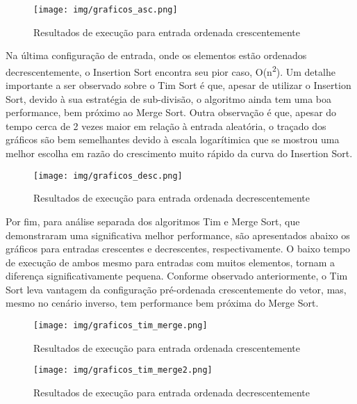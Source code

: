 \begin{figure}[!htb]
\centering
\texttt{[image: img/graficos\_asc.png]}
\caption{Resultados de execução para entrada ordenada crescentemente}
\label{fig:grafico_asc}
\end{figure}

Na última configuração de entrada, onde os elementos estão ordenados decrescentemente, o Insertion Sort encontra seu pior caso, O(n\textsuperscript{2}). Um detalhe importante a ser observado sobre o Tim Sort é que, apesar de utilizar o Insertion Sort, devido à sua estratégia de sub-divisão, o algoritmo ainda tem uma boa performance, bem próximo ao Merge Sort. Outra observação é que, apesar do tempo cerca de 2 vezes maior em relação à entrada aleatória, o traçado dos gráficos são bem semelhantes devido à escala logarítimica que se mostrou uma melhor escolha em razão do crescimento muito rápido da curva do Insertion Sort.

\begin{figure}[!htb]
\centering
\texttt{[image: img/graficos\_desc.png]}
\caption{Resultados de execução para entrada ordenada decrescentemente}
\label{fig:grafico_desc}
\end{figure}

Por fim, para análise separada dos algoritmos Tim e Merge Sort, que demonstraram uma significativa melhor performance, são apresentados abaixo os gráficos para entradas crescentes e decrescentes, respectivamente. O baixo tempo de execução de ambos mesmo para entradas com muitos elementos, tornam a diferença significativamente pequena. Conforme observado anteriormente, o Tim Sort leva vantagem da configuração pré-ordenada crescentemente do vetor, mas, mesmo no cenário inverso, tem performance bem próxima do Merge Sort. 

\begin{figure}[!htb]
\centering
\texttt{[image: img/graficos\_tim\_merge.png]}
\caption{Resultados de execução para entrada ordenada crescentemente}
\label{fig:grafico_tim_merge}
\end{figure}

\begin{figure}[!htb]
\centering
\texttt{[image: img/graficos\_tim\_merge2.png]}
\caption{Resultados de execução para entrada ordenada decrescentemente}
\label{fig:grafico_tim_merge2}
\end{figure}

